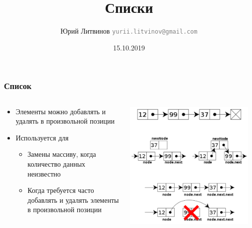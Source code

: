 \documentclass[xetex,mathserif,serif]{beamer}
\title{Списки}
\author[Юрий Литвинов]{Юрий Литвинов \newline \textcolor{gray}{\small\texttt{yurii.litvinov@gmail.com}}}
\date{15.10.2019}
\begin{document}
	
	\frame{\titlepage}
	
	\begin{frame}
		\frametitle{Список}
		\begin{columns}
			\begin{column}{0.55\textwidth}
				\begin{itemize}
					\item Элементы можно добавлять и удалять в произвольной позиции
					\item Используется для
					\begin{itemize}
						\item Замены массиву, когда количество данных неизвестно
						\item Когда требуется часто добавлять и удалять элементы в произвольной позиции
					\end{itemize}
				\end{itemize}
			\end{column}
			\begin{column}{0.45\textwidth}
				\begin{center}
					\includegraphics[width=0.95\textwidth]{list.png}
				\end{center}
			\end{column}
		\end{columns}
	\end{frame}
\end{document}
